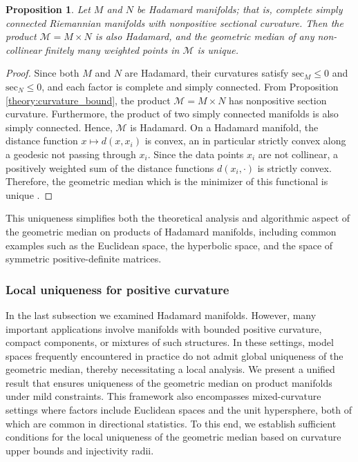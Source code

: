 \documentclass[10pt]{article}
\newtheorem{proposition}[theorem]{Proposition}
\newcommand{\calM}{\mathcal{M}}
\begin{document}
\begin{proposition}\label{theory:result1_hadamard}
Let $M$ and $N$ be Hadamard manifolds; that is, complete simply connected Riemannian manifolds with nonpositive sectional curvature. Then the product $\calM=M\times N$ is also Hadamard, and the geometric median of any non-collinear finitely many weighted points in $\calM$ is unique. 
\end{proposition}
\begin{proof}
Since both $M$ and $N$ are Hadamard, their curvatures satisfy  $\text{sec}_M \leq 0$ and $\text{sec}_N \leq 0$, and  each factor is complete and simply connected. From Proposition \ref{theory:curvature_bound}, the product $\calM = M\times N$ has nonpositive section curvature. Furthermore, the product of two simply connected manifolds is also simply connected. Hence, $\calM$ is Hadamard. On a Hadamard manifold, the distance function $x\mapsto d(x,x_i)$ is convex, an in particular strictly convex along a geodesic not passing through $x_i$. Since the data points $x_i$ are not collinear, a positively weighted sum of the distance functions $d(x_i, \cdot)$ is strictly convex. Therefore, the geometric median which is the minimizer of this functional is unique \citep{rockafellar_1997_ConvexAnalysis}.
\end{proof} 

This uniqueness simplifies both the theoretical analysis and algorithmic aspect of the geometric median on products of Hadamard manifolds, including common examples such as the Euclidean space, the hyperbolic space, and the space of symmetric positive-definite matrices.


\subsubsection{Local uniqueness for positive curvature}


In the last subsection we examined Hadamard manifolds. However, many important applications involve manifolds with bounded positive curvature, compact components, or mixtures of such structures. In these settings, model spaces frequently encountered in practice do not admit global uniqueness of the geometric median, thereby necessitating a local analysis. We present a unified result that ensures uniqueness of the geometric median on product manifolds under mild constraints. This framework also encompasses mixed-curvature settings where factors include Euclidean spaces and the unit hypersphere, both of which are common in directional statistics. To this end, we establish sufficient conditions for the local uniqueness of the geometric median based on curvature upper bounds and injectivity radii.
\end{document}
